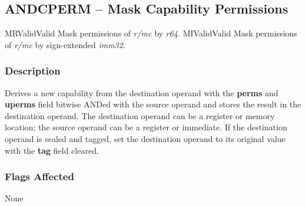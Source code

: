 \clearpage
{}
{}
\subsection*{ANDCPERM -- Mask Capability Permissions}

\begin{x86opcodetable}
  {MR}{Valid}{Valid}
  {Mask permissions of \emph{r/mc} by \emph{r64}.}
  {MI}{Valid}{Valid}
  {Mask permissions of \emph{r/mc} by sign-extended \emph{imm32}.}
\end{x86opcodetable}

\begin{x86opentable}
\end{x86opentable}

\subsubsection*{Description}

Derives a new capability from the destination operand with the
\textbf{perms} and \textbf{uperms} field bitwise ANDed with the source
operand and stores the result in the destination operand.  The
destination operand can be a register or memory location; the source
operand can be a register or immediate.  If the destination operand is
sealed and tagged, set the destination operand to its original value
with the \textbf{tag} field cleared.

\subsubsection*{Flags Affected}

None
